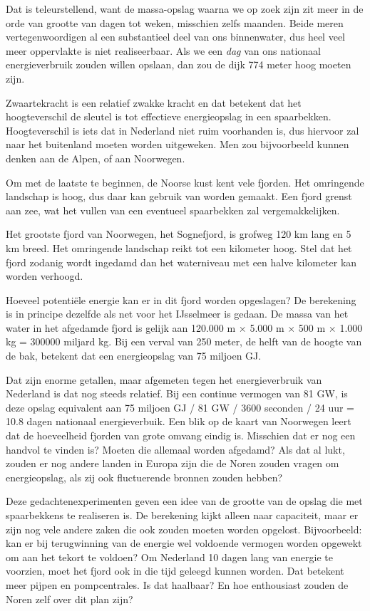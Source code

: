 \documentclass[
  11pt,
  a4paper,
]{book}
\begin{document}
Dat is teleurstellend, want de massa-opslag waarna we op zoek zijn zit meer in de orde van grootte van dagen tot weken, misschien zelfs maanden. Beide meren vertegenwoordigen al een substantieel deel van ons binnenwater, dus heel veel meer oppervlakte is niet realiseerbaar. Als we een \emph{dag} van ons nationaal energieverbruik zouden willen opslaan, dan zou de dijk 774 meter hoog moeten zijn.

Zwaartekracht is een relatief zwakke kracht en dat betekent dat het hoogteverschil de sleutel is tot effectieve energieopslag in een spaarbekken. Hoogteverschil is iets dat in Nederland niet ruim voorhanden is, dus hiervoor zal naar het buitenland moeten worden uitgeweken. Men zou bijvoorbeeld kunnen denken aan de Alpen, of aan Noorwegen.

Om met de laatste te beginnen, de Noorse kust kent vele fjorden. Het omringende landschap is hoog, dus daar kan gebruik van worden gemaakt. Een fjord grenst aan zee, wat het vullen van een eventueel spaarbekken zal vergemakkelijken.

Het grootste fjord van Noorwegen, het Sognefjord, is grofweg 120 km lang en 5 km breed. Het omringende landschap reikt tot een kilometer hoog. Stel dat het fjord zodanig wordt ingedamd dan het waterniveau met een halve kilometer kan worden verhoogd.

Hoeveel potentiële energie kan er in dit fjord worden opgeslagen? De berekening is in principe dezelfde als net voor het IJsselmeer is gedaan. De massa van het water in het afgedamde fjord is gelijk aan 120.000 m \(\times\) 5.000 m \(\times\) 500 m \(\times\) 1.000 kg = 300000 miljard kg. Bij een verval van 250 meter, de helft van de hoogte van de bak, betekent dat een energieopslag van 75 miljoen GJ.

Dat zijn enorme getallen, maar afgemeten tegen het energieverbruik van Nederland is dat nog steeds relatief. Bij een continue vermogen van 81 GW, is deze opslag equivalent aan 75 miljoen GJ / 81 GW / 3600 seconden / 24 uur = 10.8 dagen nationaal energieverbuik. Een blik op de kaart van Noorwegen leert dat de hoeveelheid fjorden van grote omvang eindig is. Misschien dat er nog een handvol te vinden is? Moeten die allemaal worden afgedamd? Als dat al lukt, zouden er nog andere landen in Europa zijn die de Noren zouden vragen om energieopslag, als zij ook fluctuerende bronnen zouden hebben?

Deze gedachtenexperimenten geven een idee van de grootte van de opslag die met spaarbekkens te realiseren is. De berekening kijkt alleen naar capaciteit, maar er zijn nog vele andere zaken die ook zouden moeten worden opgelost. Bijvoorbeeld: kan er bij terugwinning van de energie wel voldoende vermogen worden opgewekt om aan het tekort te voldoen? Om Nederland 10 dagen lang van energie te voorzien, moet het fjord ook in die tijd geleegd kunnen worden. Dat betekent meer pijpen en pompcentrales. Is dat haalbaar? En hoe enthousiast zouden de Noren zelf over dit plan zijn?
\end{document}

